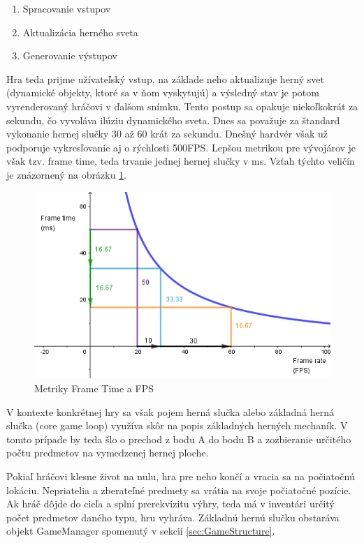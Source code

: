 \documentclass[slovak, master]{diploma}
\begin{document}
\begin{enumerate}
  \item Spracovanie vstupov
  \item Aktualizácia herného sveta
  \item Generovanie výstupov
\end{enumerate}

Hra teda prijme užívateľský vstup, na základe neho aktualizuje herný svet (dynamické objekty, ktoré sa v ňom vyskytujú) a výsledný stav je potom vyrenderovaný hráčovi v ďalšom snímku. Tento postup sa opakuje niekoľkokrát za sekundu, čo vyvoláva ilúziu dynamického sveta. Dnes sa považuje za štandard vykonanie hernej slučky 30 až 60 krát za sekundu. Dnešný hardvér však už podporuje vykresľovanie aj o rýchlosti 500FPS. Lepšou metrikou pre vývojárov je však tzv. frame time, teda trvanie jednej hernej slučky v ms. Vzťah týchto veličín je znázornený na obrázku \ref{pic:FrameTimeFPS}.

\begin{figure}[!htbp]
    \centering
    \includegraphics[width=.8\textwidth]{Figures/frameTimeVsFPS.png}
    \caption{Metriky Frame Time a FPS \cite{FrameTimeFPS}}
    \label{pic:FrameTimeFPS}
\end{figure}

V kontexte konkrétnej hry sa však pojem herná slučka alebo základná herná slučka (core game loop) využíva skôr na popis základných herných mechaník. V tomto prípade by teda šlo o prechod z bodu A do bodu B a zozbieranie určitého počtu predmetov na vymedzenej hernej ploche.

Pokiaľ hráčovi klesne život na nulu, hra pre neho končí a vracia sa na počiatočnú lokáciu. Nepriatelia a zberateľné predmety sa vrátia na svoje počiatočné pozície. Ak hráč dôjde do cieľa a splní prerekvizitu výhry, teda má v inventári určitý počet predmetov daného typu, hru vyhráva. Základnú hernú slučku obstaráva objekt GameManager spomenutý v sekcií \ref{sec:GameStructure}. 
\end{document}
